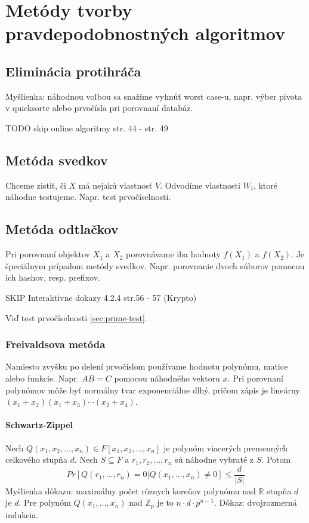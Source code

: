 \documentclass[12pt,a4paper]{article}
\begin{document}
 
\section{Metódy tvorby pravdepodobnostných algoritmov} 
\subsection{Eliminácia protihráča}
Myšlienka: náhodnou voľbou sa snažíme vyhnúť worst case-u, napr. výber pivota v quicksorte alebo prvočísla pri porovnaní databáz. 

TODO skip online algoritmy str. 44 - str. 49 

\subsection{Metóda svedkov}
Chceme zistiť, či $X$ má nejakú vlastnosť $V$. Odvodíme vlastnosti $W_i$, ktoré náhodne testujeme. Napr. test prvočíselnosti. 

\subsection{Metóda odtlačkov} 
Pri porovnaní objektov $X_1$ a $X_2$ porovnávame iba hodnoty $f(X_1)$ a $f(X_2)$. Je špeciálnym prípadom metódy svedkov. Napr. porovnanie dvoch súborov pomocou ich hashov, resp. prefixov. 

SKIP Interaktivne dokazy 4.2.4 str.56 - 57 (Krypto) 

Viď test prvočíselnosti \ref{sec:prime-test}. 

\subsubsection{Freivaldsova metóda}
Namiesto zvyšku po delení prvočíslom používame hodnotu polynómu, matice alebo funkcie. Napr. $AB=C$ pomocou náhodného vektoru $x$. Pri porovnaní polynómov môže byť normálny tvar exponenciálne dlhý, pričom zápis je lineárny $(x_1 + x_2)(x_1 + x_3) \cdots (x_2 + x_4)$. 
\paragraph{Schwartz-Zippel} Nech $Q(x_1, x_2, \ldots, x_n) \in F[x_1, x_2, \ldots, x_n]$ je polynóm viacerých premenných celkového stupňa $d$. Nech $S \subseteq F$ a $r_1, r_2, \ldots, r_n$ sú náhodne vybraté z $S$. Potom 
$$
  Pr[Q(r_1,\ldots,r_n) = 0 | Q(x_1, \ldots, x_n) \neq 0] \leq \frac{d}{|S|}
$$
Myšlienka dôkazu: maximálny počet rôznych koreňov polynómu nad $\mathbb{R}$ stupňa $d$ je $d$. Pre polynóm $Q(x_1, \ldots, x_n)$ nad $\mathbb{Z}_p$ je to $n \cdot d \cdot p^{n-1}$. Dôkaz: dvojrozmerná indukcia. 
\end{document}
